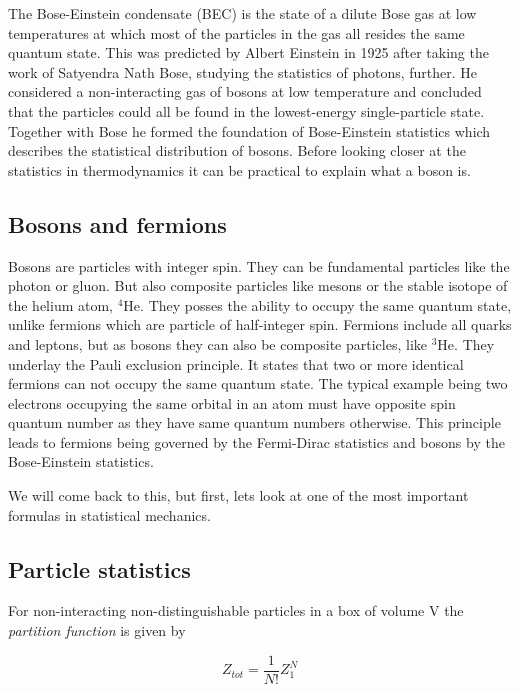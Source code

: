 The Bose-Einstein condensate (BEC) is the state of a dilute Bose gas at low temperatures at which most of the particles in the gas all resides the same quantum state. This was predicted by Albert Einstein in 1925 after taking the work of Satyendra Nath Bose, studying the statistics of photons, further. He considered a non-interacting gas of bosons at low temperature and concluded that the particles could all be found in the lowest-energy single-particle state. Together with Bose he formed the foundation of Bose-Einstein statistics which describes the statistical distribution of bosons. Before looking closer at the statistics in thermodynamics it can be practical to explain what a boson is.

\subsection{Bosons and fermions}
Bosons are particles with integer spin. They can be fundamental particles like the photon or gluon. But also composite particles like mesons or the stable isotope of the helium atom, $^4\text{He}$. They posses the ability to occupy the same quantum state, unlike fermions which are particle of half-integer spin. Fermions include all quarks and leptons, but as bosons they can also be composite particles, like $^3\text{He}$. They underlay the Pauli exclusion principle. It states that two or more identical fermions can not occupy the same quantum state. 
The typical example being two electrons occupying the same orbital in an atom must have opposite spin quantum number as they have same quantum numbers otherwise. 
This principle leads to fermions being governed by the Fermi-Dirac statistics and bosons by the Bose-Einstein statistics. 


We will come back to this, but first, lets look at one of the most important formulas in statistical mechanics. 

\subsection{Particle statistics}

For non-interacting non-distinguishable particles in a box of volume V the \textit{partition function} is given by 

\begin{equation}
Z_{tot} = \frac{1}{N!} Z_1^N
\end{equation}

